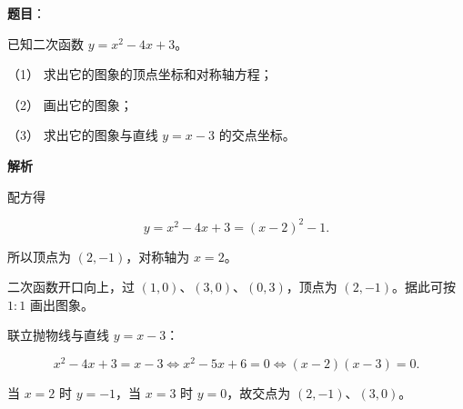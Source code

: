 \begin{answer}

\textbf{题目}：

已知二次函数 $y=x^2-4x+3$。

（1） 求出它的图象的顶点坐标和对称轴方程；

（2） 画出它的图象；

（3） 求出它的图象与直线 $y=x-3$ 的交点坐标。

\textbf{解析}


配方得

\nopagebreak[4]
\[
y=x^2-4x+3=(x-2)^2-1.
\]

所以顶点为 $(2,-1)$，对称轴为 $x=2$。


二次函数开口向上，过 $(1,0)\text{、}(3,0)\text{、}(0,3)$，顶点为 $(2,-1)$。据此可按 $1:1$ 画出图象。
\nopagebreak[4]
\begin{center}\end{center}
\nopagebreak[4]

联立抛物线与直线 $y=x-3$：

\nopagebreak[4]
\[
x^2-4x+3=x-3
\Longleftrightarrow x^2-5x+6=0
\Longleftrightarrow (x-2)(x-3)=0.
\]

当 $x=2$ 时 $y=-1$，当 $x=3$ 时 $y=0$，故交点为 $(2,-1)\text{、}(3,0)$。




\end{answer}